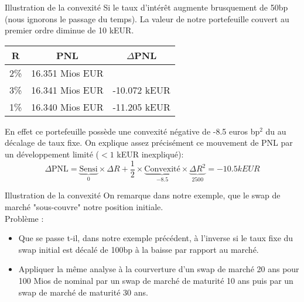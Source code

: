 \documentclass{beamer}
\begin{document}
\begin{frame}{Illustration de la convexité}
Si le taux d'intérêt augmente brusquement de 50bp (nous ignorons le passage du temps).
La valeur de notre portefeuille couvert au premier ordre diminue de 10 kEUR.\\
\begin{center}
\begin{tabular}{|c|c|c|}
\hline
R&PNL&$\Delta$PNL \\
\hline
2\% &16.351 Mios EUR& \\ 
3\% &16.341 Mios EUR&-10.072 kEUR\\
1\% &16.340 Mios EUR&-11.205 kEUR\\
\hline
\end{tabular}
\end{center}
En effet ce portefeuille possède une convexité négative de -8.5 euros bp$^2$ du au décalage de taux fixe.
On explique assez précisément  ce mouvement de PNL par un développement limité ($<1$ kEUR inexpliqué):
\[
\Delta \text{PNL}=\underbrace{\text{Sensi}}_{0} \times \Delta R + \frac{1}{2} \times \underbrace{\text{Convexité}}_{-8.5} \times \underbrace{\Delta R^2}_{2500}=-10.5 kEUR
\]
\end{frame}

\begin{frame}{Illustration de la convexité}
On remarque dans notre exemple, que le swap de marché "sous-couvre" notre position initiale.\\
\vspace{0.5 cm}
Problème :
\begin{itemize}
\item Que se passe t-il, dans notre exemple précédent, à l'inverse si le taux fixe du swap initial est décalé de 100bp à la baisse par rapport au marché.
\item Appliquer la même analyse à la courverture d'un swap de marché 20 ans pour 100 Mios de nominal par un swap de marché de maturité 10 ans puis par un swap de marché de maturité 30 ans.
\end{itemize}
\end{frame}
\end{document}
